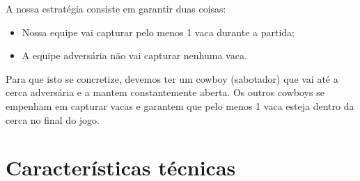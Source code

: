\documentclass{llncs}
\begin{document}

A nossa estratégia consiste em garantir duas coisas:

\begin{itemize}
\item Nossa equipe vai capturar pelo menos 1 vaca durante a partida;
\item A equipe adversária não vai capturar nenhuma vaca.
\end{itemize}

Para que isto se concretize, devemos ter um cowboy (sabotador) que vai até a cerca adversária e a mantem constantemente aberta. Os outros cowboys se empenham em capturar vacas e garantem que pelo menos 1 vaca esteja dentro da cerca no final do jogo.


\section{Características técnicas}
\end{document}
